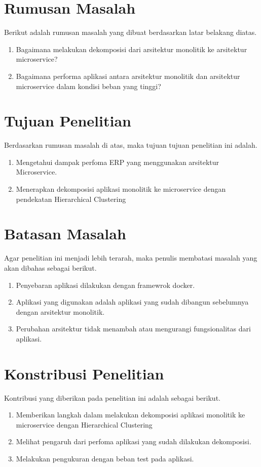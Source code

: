 \section{Rumusan Masalah}
Berikut adalah rumusan masalah yang dibuat berdasarkan latar belakang diatas.
\begin{enumerate}[nolistsep,leftmargin=0.5cm]
  \item Bagaimana melakukan dekomposisi dari arsitektur monolitik ke arsitektur microservice?
  \item Bagaimana performa aplikasi antara arsitektur monolitik dan arsitektur microservice dalam kondisi beban yang tinggi?\\
\end{enumerate}

\section{Tujuan Penelitian}
Berdasarkan rumusan masalah di atas, maka tujuan tujuan penelitian ini adalah.
\begin{enumerate}[nolistsep,leftmargin=0.5cm]
  \item Mengetahui dampak perfoma ERP yang menggunakan arsitektur Microservice.
  \item Menerapkan dekomposisi aplikasi monolitik ke microservice dengan pendekatan Hierarchical Clustering\\
\end{enumerate}

\section{Batasan Masalah}
Agar penelitian ini menjadi lebih terarah, maka penulis membatasi masalah yang akan dibahas sebagai berikut.
\begin{enumerate}[nolistsep,leftmargin=0.5cm]
  \item Penyebaran aplikasi dilakukan dengan framewrok docker.
  \item Aplikasi yang digunakan adalah aplikasi yang sudah dibangun sebelumnya dengan arsitektur monolitik.
  \item Perubahan arsitektur tidak menambah atau mengurangi fungsionalitas dari aplikasi.\\
\end{enumerate}

\section{Konstribusi Penelitian}
Kontribusi yang diberikan pada penelitian ini adalah sebagai berikut.
\begin{enumerate}[nolistsep,leftmargin=0.5cm]
  \item Memberikan langkah dalam melakukan dekomposisi aplikasi monolitik ke microservice dengan Hierarchical Clustering  
  \item Melihat pengaruh dari perfoma aplikasi yang sudah dilakukan dekomposisi.
  \item Melakukan pengukuran dengan beban test pada aplikasi.\\
\end{enumerate}

